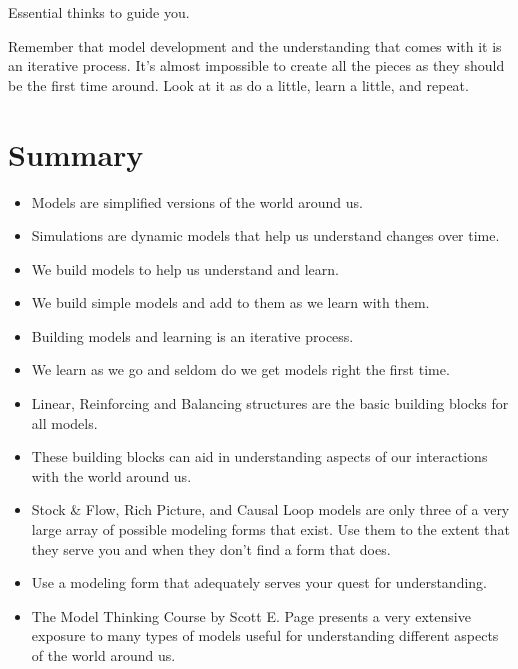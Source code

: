 \documentclass[]{memoir}
\begin{document}
\FloatBarrier 

\begin{model}[frametitle={Model: Modeling Guidelines}] 

 Essential thinks to guide you.




 \end{model}

Remember that model development and the understanding that comes with it
is an iterative process. It's almost impossible to create all the pieces
as they should be the first time around. Look at it as do a little,
learn a little, and repeat.

\section{Summary}

\begin{itemize}
\itemsep1pt\parskip0pt
\item
  Models are simplified versions of the world around us.
\item
  Simulations are dynamic models that help us understand changes over
  time.
\item
  We build models to help us understand and learn.
\item
  We build simple models and add to them as we learn with them.
\item
  Building models and learning is an iterative process.
\item
  We learn as we go and seldom do we get models right the first time.
\item
  Linear, Reinforcing and Balancing structures are the basic building
  blocks for all models.
\item
  These building blocks can aid in understanding aspects of our
  interactions with the world around us.
\item
  Stock \& Flow, Rich Picture, and Causal Loop models are only three of
  a very large array of possible modeling forms that exist. Use them to
  the extent that they serve you and when they don't find a form that
  does.
\item
  Use a modeling form that adequately serves your quest for
  understanding.
\item
  The Model Thinking Course by Scott E. Page presents a very extensive
  exposure to many types of models useful for understanding different
  aspects of the world around us.
\end{itemize}
\end{document}
